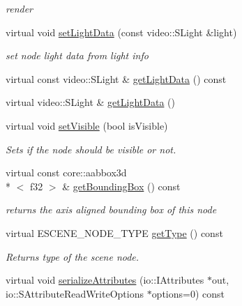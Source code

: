 \begin{DoxyCompactItemize}
\begin{DoxyCompactList}\small\item\em render \end{DoxyCompactList}\item 
virtual void \hyperlink{classirr_1_1scene_1_1_c_light_scene_node_a3382a9b3e592e9f6b461f34cd5db45db}{set\-Light\-Data} (const video\-::\-S\-Light \&light)
\begin{DoxyCompactList}\small\item\em set node light data from light info \end{DoxyCompactList}\item 
virtual const video\-::\-S\-Light \& \hyperlink{classirr_1_1scene_1_1_c_light_scene_node_ad0dfccdf8858bdb3d7b46191b69fdfdb}{get\-Light\-Data} () const 
\item 
virtual video\-::\-S\-Light \& \hyperlink{classirr_1_1scene_1_1_c_light_scene_node_ae7e96f973078ee4700defd4f72710ea5}{get\-Light\-Data} ()
\item 
virtual void \hyperlink{classirr_1_1scene_1_1_c_light_scene_node_af697a6649809954ec3e8df38ef47a3dd}{set\-Visible} (bool is\-Visible)
\begin{DoxyCompactList}\small\item\em Sets if the node should be visible or not. \end{DoxyCompactList}\item 
\hypertarget{classirr_1_1scene_1_1_c_light_scene_node_a544235779efd8ba8197996d90661d1c1}{virtual const core\-::aabbox3d\\*
$<$ f32 $>$ \& \hyperlink{classirr_1_1scene_1_1_c_light_scene_node_a544235779efd8ba8197996d90661d1c1}{get\-Bounding\-Box} () const }\label{classirr_1_1scene_1_1_c_light_scene_node_a544235779efd8ba8197996d90661d1c1}

\begin{DoxyCompactList}\small\item\em returns the axis aligned bounding box of this node \end{DoxyCompactList}\item 
\hypertarget{classirr_1_1scene_1_1_c_light_scene_node_a05101a21c0ff061efb015bd15a8c6f00}{virtual E\-S\-C\-E\-N\-E\-\_\-\-N\-O\-D\-E\-\_\-\-T\-Y\-P\-E \hyperlink{classirr_1_1scene_1_1_c_light_scene_node_a05101a21c0ff061efb015bd15a8c6f00}{get\-Type} () const }\label{classirr_1_1scene_1_1_c_light_scene_node_a05101a21c0ff061efb015bd15a8c6f00}

\begin{DoxyCompactList}\small\item\em Returns type of the scene node. \end{DoxyCompactList}\item 
\hypertarget{classirr_1_1scene_1_1_c_light_scene_node_ad90879f6438587d340807dfcf51a37f0}{virtual void \hyperlink{classirr_1_1scene_1_1_c_light_scene_node_ad90879f6438587d340807dfcf51a37f0}{serialize\-Attributes} (io\-::\-I\-Attributes $\ast$out, io\-::\-S\-Attribute\-Read\-Write\-Options $\ast$options=0) const }\label{classirr_1_1scene_1_1_c_light_scene_node_ad90879f6438587d340807dfcf51a37f0}


\end{DoxyCompactItemize}
